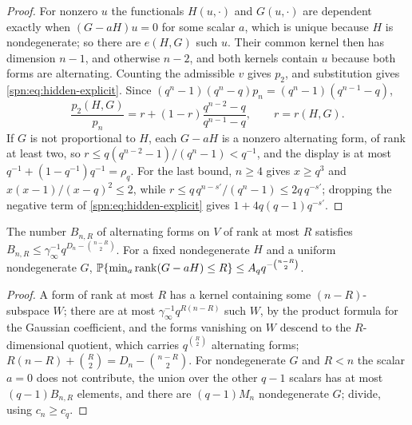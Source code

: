 \begin{proof}
For nonzero $u$ the functionals $H(u,\cdot)$ and $G(u,\cdot)$ are dependent exactly when
$(G-aH)u=0$ for some scalar $a$, which is unique because $H$ is nondegenerate; so there are
$e(H,G)$ such $u$. Their common kernel then has dimension $n-1$, and otherwise $n-2$, and both
kernels contain $u$ because both forms are alternating. Counting the admissible $v$ gives $p_2$, and
substitution gives \eqref{spn:eq:hidden-explicit}. Since $(q^n-1)(q^n-q)p_n=(q^n-1)(q^{n-1}-q)$,
\[
 \frac{p_2(H,G)}{p_n}=r+(1-r)\frac{q^{n-2}-q}{q^{n-1}-q},\qquad r=r(H,G).
\]
If $G$ is not proportional to $H$, each $G-aH$ is a nonzero alternating form, of rank at least two,
so $r\le q(q^{n-2}-1)/(q^n-1)<q^{-1}$, and the display is at most
$q^{-1}+(1-q^{-1})q^{-1}=\rho_q$. For the last bound, $n\ge4$ gives $x\ge q^3$ and
$x(x-1)/(x-q)^2\le2$, while $r\le q\,q^{n-s'}/(q^n-1)\le2q\,q^{-s'}$; dropping the negative term of
\eqref{spn:eq:hidden-explicit} gives $1+4q(q-1)q^{-s'}$.
\end{proof}

\begin{lemma}\label{spn:lem:hidden-rank}
The number $B_{n,R}$ of alternating forms on $V$ of rank at most $R$ satisfies
$B_{n,R}\le\gamma_\infty^{-1}q^{D_n-\binom{n-R}2}$. For a fixed nondegenerate $H$ and a uniform
nondegenerate $G$, $\mathbb{P}\{\min_a\operatorname{rank}(G-aH)\le R\}\le A_qq^{-\binom{n-R}2}$.
\end{lemma}

\begin{proof}
A form of rank at most $R$ has a kernel containing some $(n-R)$-subspace $W$; there are at most
$\gamma_\infty^{-1}q^{R(n-R)}$ such $W$, by the product formula for the Gaussian coefficient, and the
forms vanishing on $W$ descend to the $R$-dimensional quotient, which carries $q^{\binom R2}$
alternating forms; $R(n-R)+\binom R2=D_n-\binom{n-R}2$. For nondegenerate $G$ and $R<n$ the scalar
$a=0$ does not contribute, the union over the other $q-1$ scalars has at most $(q-1)B_{n,R}$
elements, and there are $(q-1)M_n$ nondegenerate $G$; divide, using $c_n\ge c_q$.
\end{proof}

